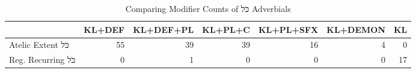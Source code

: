 \begin{table}[htbp!]
\centering
\caption{Comparing Modifier Counts of כֹּל Adverbials}
\label{table:kl_cf_ct}
\begin{adjustbox}{width=1\textwidth}
\begin{tabular}{lrrrrrr}
\toprule
{} &  KL+DEF &  KL+DEF+PL &  KL+PL+C &  KL+PL+SFX &  KL+DEMON &  KL \\
\midrule
Atelic Extent כֹּל  &      55 &         39 &       39 &         16 &         4 &   0 \\
Reg. Recurring כֹּל &       0 &          1 &        0 &          0 &         0 &  17 \\
\bottomrule
\end{tabular}
\end{adjustbox}
\end{table}
